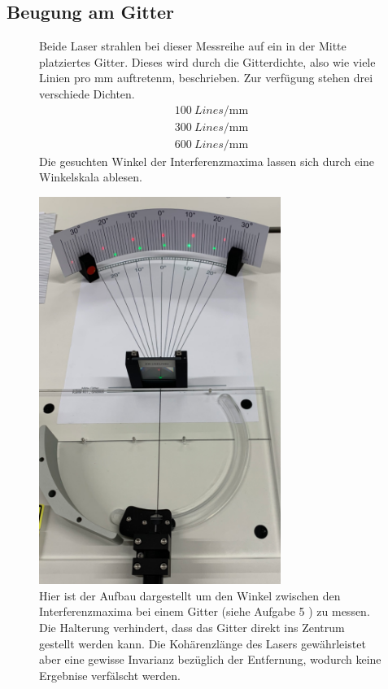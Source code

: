 \subsection{Beugung am Gitter}
\begin{figure}
\begin{minipage}[b]{0.5\textwidth}
Beide Laser strahlen bei dieser Messreihe auf ein in der Mitte platziertes Gitter. Dieses wird durch die Gitterdichte, also wie viele
Linien pro $\si{\milli\meter}$ auftretenm, beschrieben. Zur verfügung stehen drei verschiede Dichten. 
\begin{align*}
    \SI{100}{Lines \per \milli\meter} \\
    \SI{300}{Lines \per \milli\meter} \\
    \SI{600}{Lines \per \milli\meter} 
\end{align*}
Die gesuchten Winkel der Interferenzmaxima lassen sich durch eine Winkelskala ablesen.
\end{minipage}
\hfill
\begin{minipage}{0.5\textwidth}
        \centering
        \includegraphics[width=0.7\textwidth]{bilder/gitter.png}
        \caption{Hier ist der Aufbau dargestellt um den Winkel zwischen den Interferenzmaxima bei einem Gitter
        (siehe Aufgabe 5 \cite{skript}) zu messen. Die Halterung verhindert, dass das Gitter direkt ins Zentrum gestellt werden kann.
        Die Kohärenzlänge des Lasers gewährleistet aber eine gewisse Invarianz bezüglich der Entfernung, wodurch keine Ergebnise verfälscht werden.}
    \end{minipage}
\end{figure}




